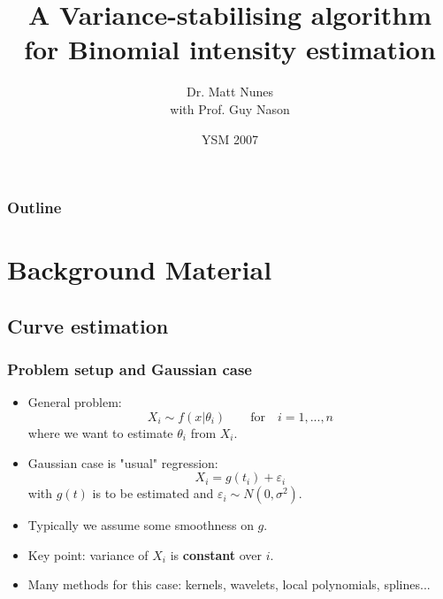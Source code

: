 \documentclass{beamer}
\title[Variance-stabilisation for Binomial data] %
{A Variance-stabilising algorithm for Binomial intensity estimation}
\subtitle {}
\author[] %
{Dr. Matt Nunes\\
with Prof. Guy Nason}
\institute[University of Bristol] %
{
  Department of Mathematics\\
  University of Bristol}
\date[April 2007] %
{YSM 2007}
\def\ep{\varepsilon}
\def\th{\theta}
\def\beq{\begin{equation}}
\def\eeq{\end{equation}}
\begin{document}
\begin{frame}
  \titlepage
\end{frame}

\begin{frame}
  \frametitle{Outline}
  \tableofcontents
\end{frame}





\section{Background Material}

\subsection{Curve estimation}

\begin{frame}
\frametitle{Problem setup and Gaussian case}
\begin{itemize}
\item General problem:
$$X_i \sim f(x|\th_i) \qquad {\mbox{for}} \quad i=1,...,n$$
where we want to estimate $\th_i$ from $X_i$.   \pause
\item  Gaussian case is "usual" regression: \beq X_i = g(t_i) +
\ep_i \eeq
 with $g(t)$ is to be estimated and $\ep_i \sim N(0, \sigma^2)$.   \pause
\item Typically we assume some smoothness on $g$. \pause
\item Key point: variance of $X_i$ is {\bf{constant}} over $i$. \pause
\item Many methods for this case: kernels, wavelets, local polynomials, splines...
\end{itemize}
\end{frame}
\end{document}
